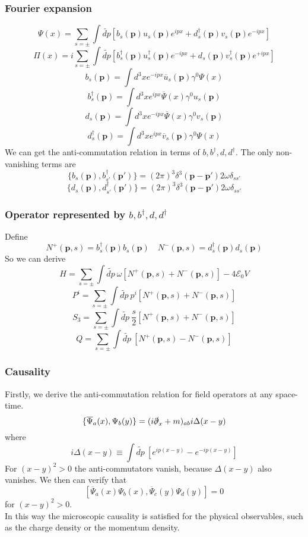 \subsubsection{Fourier expansion}
\[\Psi(x) = \sum_{s = \pm} \int \widetilde{dp} \left[ b_s(\bm{p})u_s(\bm{p}) e^{ipx} + d^{\dagger}_s(\bm{p})v_s(\bm{p}) e^{-ipx}\right]\]
\[\Pi(x) = i\sum_{s = \pm} \int \widetilde{dp} \left[ b^{\dagger}_s(\bm{p})u^{\dagger}_s(\bm{p}) e^{-ipx} + d_s(\bm{p})v^{\dagger}_s(\bm{p}) e^{+ipx}\right]\]
\[b_s(\bm{p}) = \int d^3x e^{-ipx} \overline{u}_s(\bm{p}) \gamma^0 \Psi(x)\]
\[b^{\dagger}_s(\bm{p}) = \int d^3x e^{ipx} \overline{\Psi}(x) \gamma^0 u_s(\bm{p})\]
\[d_s(\bm{p}) = \int d^3x e^{-ipx} \overline{\Psi}(x) \gamma^0 v_s(\bm{p})\]
\[d^{\dagger}_s(\bm{p}) = \int d^3x e^{ipx} \overline{v}_s(\bm{p}) \gamma^0 \Psi(x)\]
We can get the anti-commutation relation in terms of $b,b^{\dagger},d,d^{\dagger}$. The only non-vanishing terms are
\[\{b_s(\bm{p}),b^{\dagger}_{s'}(\bm{p}')\} = (2\pi)^3 \delta^3(\bm{p}-\bm{p}')2\omega \delta_{ss'}\]
\[\{d_s(\bm{p}),d^{\dagger}_{s'}(\bm{p}')\} = (2\pi)^3 \delta^3(\bm{p}-\bm{p}')2\omega \delta_{ss'}\]

\subsubsection{Operator represented by $b,b^{\dagger},d,d^{\dagger}$}
\noindent
Define
\[N^{+}(\bm{p},s) = b^{\dagger}_s(\bm{p}) b_s(\bm{p}) \quad N^{-}(\bm{p},s) = d^{\dagger}_s(\bm{p}) d_s(\bm{p})\]
So we can derive
\[ H = \sum_{s=\pm} \int \widetilde{dp} \: \omega \left[ N^{+}(\bm{p},s) + N^{-}(\bm{p},s)\right] - 4\mathcal{E}_0V\]
\[ P^i = \sum_{s=\pm} \int \widetilde{dp} \: p^i \left[ N^{+}(\bm{p},s) + N^{-}(\bm{p},s)\right] \]
\[S_3 = \sum_{s=\pm} \int \widetilde{dp} \: \frac{s}{2} \left[ N^{+}(\bm{p},s) + N^{-}(\bm{p},s)\right]\]
\[Q = \sum_{s=\pm} \int \widetilde{dp} \: \left[ N^{+}(\bm{p},s) - N^{-}(\bm{p},s)\right]\]

\subsubsection{Causality}
\noindent
Firstly, we derive the anti-commutation relation for field operators at any space-time.
\[\{\overline{\Psi}_{a}(x),\Psi_{b}(y)\} = (i\slashed{\partial}_x + m)_{ab} i\Delta(x-y)\]
where
\[i\Delta(x-y) \equiv \int \widetilde{dp} \: [e^{ip(x-y)} - e^{-ip(x-y)}]\]
For $(x-y)^2 > 0$ the anti-commutators vanish, because $\Delta(x-y)$ also vanishes. 
We then can verify that
\[[\overline{\Psi}_{a}(x)\Psi_{b}(x),\overline{\Psi}_{c}(y)\Psi_{d}(y)] = 0\]
for $(x-y)^2 > 0$.\\
In this way the microscopic causality is satisfied for the physical observables, such as the charge density or the momentum density.

